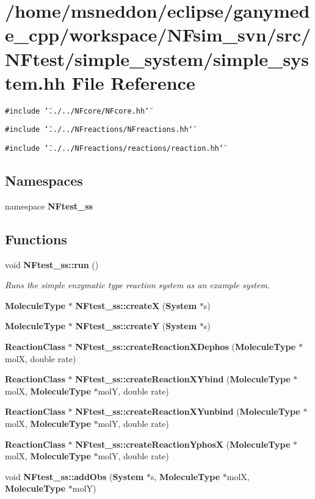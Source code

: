\section{/home/msneddon/eclipse/ganymede\_\-cpp/workspace/NFsim\_\-svn/src/NFtest/simple\_\-system/simple\_\-system.hh File Reference}
\label{simple__system_8hh}


{\tt \#include \char`\"{}../../NFcore/NFcore.hh\char`\"{}}\par
{\tt \#include \char`\"{}../../NFreactions/NFreactions.hh\char`\"{}}\par
{\tt \#include \char`\"{}../../NFreactions/reactions/reaction.hh\char`\"{}}\par
\subsection*{Namespaces}
\begin{CompactItemize}
\item 
namespace {\bf NFtest\_\-ss}
\end{CompactItemize}
\subsection*{Functions}
\begin{CompactItemize}
\item 
void {\bf NFtest\_\-ss::run} ()
\begin{CompactList}\small\item\em Runs the simple enzymatic type reaction system as an example system. \item\end{CompactList}\item 
{\bf MoleculeType} $\ast$ {\bf NFtest\_\-ss::createX} ({\bf System} $\ast$s)
\item 
{\bf MoleculeType} $\ast$ {\bf NFtest\_\-ss::createY} ({\bf System} $\ast$s)
\item 
{\bf ReactionClass} $\ast$ {\bf NFtest\_\-ss::createReactionXDephos} ({\bf MoleculeType} $\ast$molX, double rate)
\item 
{\bf ReactionClass} $\ast$ {\bf NFtest\_\-ss::createReactionXYbind} ({\bf MoleculeType} $\ast$molX, {\bf MoleculeType} $\ast$molY, double rate)
\item 
{\bf ReactionClass} $\ast$ {\bf NFtest\_\-ss::createReactionXYunbind} ({\bf MoleculeType} $\ast$molX, {\bf MoleculeType} $\ast$molY, double rate)
\item 
{\bf ReactionClass} $\ast$ {\bf NFtest\_\-ss::createReactionYphosX} ({\bf MoleculeType} $\ast$molX, {\bf MoleculeType} $\ast$molY, double rate)
\item 
void {\bf NFtest\_\-ss::addObs} ({\bf System} $\ast$s, {\bf MoleculeType} $\ast$molX, {\bf MoleculeType} $\ast$molY)
\end{CompactItemize}
